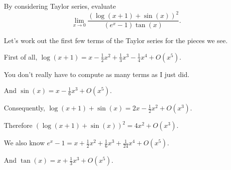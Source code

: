 \documentclass{ximera}
\begin{document}

            \begin{question}
              By considering Taylor series, evaluate \[\lim_{x \to 0} \displaystyle\frac{{\left(\log\left(x + 1\right) + \sin\left(x\right)\right)}^{2}}{{\left(e^{x} - 1\right)} \tan\left(x\right)}.\]

              \begin{solution}
                \begin{hint}
                  Let's work out the first few terms of the Taylor series for the pieces we see.
                \end{hint}
                \begin{hint}
                  First of all, \(\log\left(x + 1\right) = x - \displaystyle\frac{1}{2}x^{2} + \displaystyle\frac{1}{3}x^{3} - \displaystyle\frac{1}{4}x^{4} + O(x^{5})\).
                \end{hint}
                \begin{hint}
                  You don't really have to compute as many terms as I just did.
                \end{hint}
                \begin{hint}
                  And \(\sin\left(x\right) = x - \displaystyle\frac{1}{6}x^{3} + O(x^{5})\).
                \end{hint}
                \begin{hint}
                  Consequently, \(\log\left(x + 1\right) + \sin\left(x\right) = 2x - \displaystyle\frac{1}{2}x^{2} + O(x^{3})\).
                \end{hint}
                \begin{hint}
                  Therefore \(\left(\log\left(x + 1\right) + \sin\left(x\right)\right)^2 = 4x^{2} + O(x^{3})\).
                \end{hint}
                \begin{hint}
                  We also know \(e^{x} - 1 = x + \displaystyle\frac{1}{2}x^{2} + \displaystyle\frac{1}{6}x^{3} + \displaystyle\frac{1}{24}x^{4} + O(x^{5})\).
                \end{hint}
                \begin{hint}
                  And \(\tan\left(x\right) = x + \displaystyle\frac{1}{3}x^{3} + O(x^{5})\).
                \end{hint}
                \begin{hint}

\end{hint}
\end{solution}
\end{question}
\end{document}
